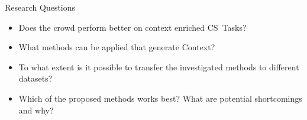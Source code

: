 \documentclass[final,hyperref={pdfpagelabels=true}]{beamer}
\begin{document}
\begin{frame}
\begin{columns}[t, onlytextwidth]
\begin{column}{\textwidth}
\begin{columns}[t, onlytextwidth]
			\begin{column}{.49\linewidth}
				\begin{block}{Research Questions}
					\begin{minipage}[t][.25\textheight][c]{\textwidth}
						\hfill
						\begin{minipage}[t]{0.93\textwidth}
					    	\begin{itemize}
								\justifying
								\setlength\itemsep{1.5cm}
					    		\item \textsc{}
								
								Does the crowd perform better on context enriched CS~Tasks?
					    		\item \textsc{}
								
								What methods can be applied that generate Context?
					    		\item \textsc{}
								
								To what extent is it possible to transfer the investigated methods to different datasets?
					    		\item \textsc{}
								
								Which of the proposed methods works best? What are potential shortcomings and why?
					    	\end{itemize}
						\end{minipage}
						\hfill
						\hbox{}
					\end{minipage}
				\end{block}
			\end{column}
			
		\end{columns}
		

\end{column}
\end{columns}
\end{frame}
\end{document}
